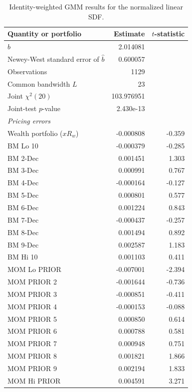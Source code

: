 \begin{table}[htbp]
\centering
\small
\caption{Identity-weighted GMM results for the normalized linear SDF.}
\label{tab:q4b-results}
\begin{tabular}{lrr}
\hline
Quantity or portfolio & Estimate & $t$-statistic \\
\hline
$\widehat{b}$ & 2.014081 & \\
Newey-West standard error of $\widehat{b}$ & 0.600057 & \\
Observations & 1129 & \\
Common bandwidth $L$ & 23 & \\
Joint $\chi^2(20)$ & 103.976951 & \\
Joint-test $p$-value & 2.430e-13 & \\
\hline
\multicolumn{3}{l}{\textit{Pricing errors}} \\
\hline
Wealth portfolio ($xR_w$) & -0.000808 & -0.359 \\
BM Lo 10 & -0.000379 & -0.285 \\
BM 2-Dec & 0.001451 & 1.303 \\
BM 3-Dec & 0.000991 & 0.767 \\
BM 4-Dec & -0.000164 & -0.127 \\
BM 5-Dec & 0.000801 & 0.577 \\
BM 6-Dec & 0.001224 & 0.843 \\
BM 7-Dec & -0.000437 & -0.257 \\
BM 8-Dec & 0.001494 & 0.892 \\
BM 9-Dec & 0.002587 & 1.183 \\
BM Hi 10 & 0.001103 & 0.411 \\
MOM Lo PRIOR & -0.007001 & -2.394 \\
MOM PRIOR 2 & -0.001644 & -0.736 \\
MOM PRIOR 3 & -0.000851 & -0.411 \\
MOM PRIOR 4 & -0.000153 & -0.088 \\
MOM PRIOR 5 & 0.000850 & 0.614 \\
MOM PRIOR 6 & 0.000788 & 0.581 \\
MOM PRIOR 7 & 0.000948 & 0.751 \\
MOM PRIOR 8 & 0.001821 & 1.866 \\
MOM PRIOR 9 & 0.002194 & 1.833 \\
MOM Hi PRIOR & 0.004591 & 3.271 \\
\hline
\end{tabular}
\end{table}
